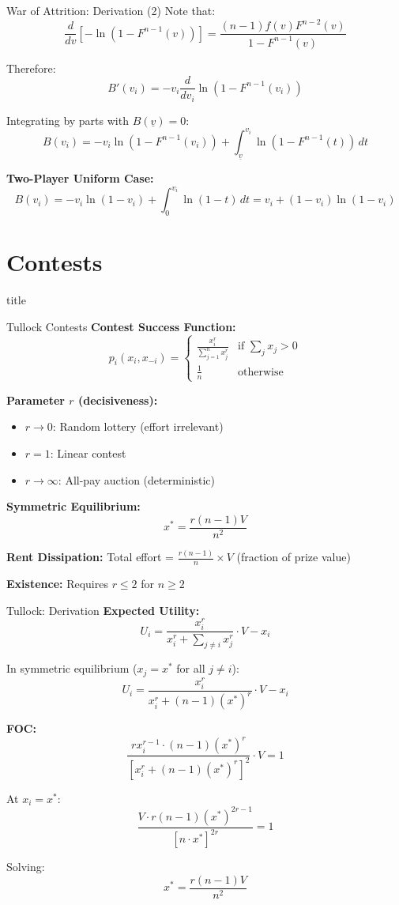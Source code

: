 \documentclass[xcolor={x11names}, aspectratio=169 ]{beamer}
\newcommand{\sectionslide}{%
  \begin{frame}
    \vfill
    \centering
    \begin{beamercolorbox}[sep=8pt,center,shadow=true,rounded=true]{title}
      \usebeamerfont{title}\insertsectionhead\par%
    \end{beamercolorbox}
    \vfill
  \end{frame}
}
\begin{document}
\begin{frame}{War of Attrition: Derivation (2)}
Note that:
$$\frac{d}{dv}[-\ln(1-F^{n-1}(v))] = \frac{(n-1)f(v)F^{n-2}(v)}{1-F^{n-1}(v)}$$

Therefore:
$$B'(v_i) = -v_i \frac{d}{dv_i}\ln(1-F^{n-1}(v_i))$$

Integrating by parts with $B(\underline{v}) = 0$:
$$B(v_i) = -v_i\ln(1-F^{n-1}(v_i)) + \int_{\underline{v}}^{v_i} \ln(1-F^{n-1}(t)) \, dt$$

\textbf{Two-Player Uniform Case:}
$$B(v_i) = -v_i\ln(1-v_i) + \int_0^{v_i} \ln(1-t) \, dt = v_i + (1-v_i)\ln(1-v_i)$$
\end{frame}

\section{Contests}
\sectionslide

\begin{frame}{Tullock Contests}
\textbf{Contest Success Function:}
$$p_i(x_i, x_{-i}) = \begin{cases}
\frac{x_i^r}{\sum_{j=1}^n x_j^r} & \text{if } \sum_j x_j > 0 \\
\frac{1}{n} & \text{otherwise}
\end{cases}$$

\textbf{Parameter $r$ (decisiveness):}
\begin{itemize}
\item $r \to 0$: Random lottery (effort irrelevant)
\item $r = 1$: Linear contest
\item $r \to \infty$: All-pay auction (deterministic)
\end{itemize}

\textbf{Symmetric Equilibrium:}
$$\boxed{x^* = \frac{r(n-1)V}{n^2}}$$

\textbf{Rent Dissipation:}
Total effort = $\frac{r(n-1)}{n} \times V$ (fraction of prize value)

\textbf{Existence:} Requires $r \leq 2$ for $n \geq 2$
\end{frame}

\begin{frame}{Tullock: Derivation}
\textbf{Expected Utility:}
$$U_i = \frac{x_i^r}{x_i^r + \sum_{j \neq i} x_j^r} \cdot V - x_i$$

In symmetric equilibrium ($x_j = x^*$ for all $j \neq i$):
$$U_i = \frac{x_i^r}{x_i^r + (n-1)(x^*)^r} \cdot V - x_i$$

\textbf{FOC:}
$$\frac{r x_i^{r-1} \cdot (n-1)(x^*)^r}{[x_i^r + (n-1)(x^*)^r]^2} \cdot V = 1$$

At $x_i = x^*$:
$$\frac{V \cdot r(n-1)(x^*)^{2r-1}}{[n \cdot x^*]^{2r}} = 1$$

Solving:
$$x^* = \frac{r(n-1)V}{n^2}$$
\end{frame}
\end{document}
